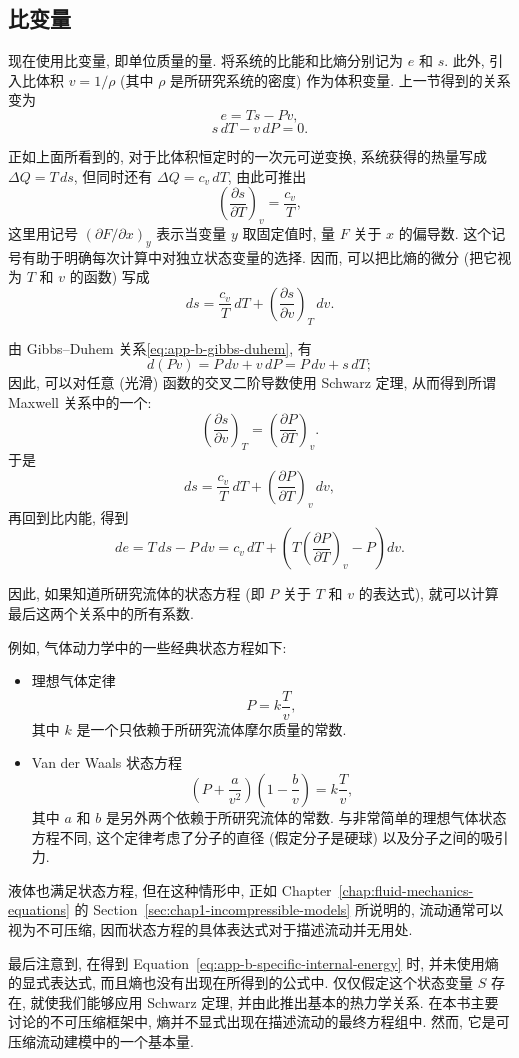 \subsection{比变量}
\label{sec:app-b-specific-variables}

现在使用比变量, 即单位质量的量. 将系统的比能和比熵分别记为 $e$ 和 $s$. 此外, 引入比体积 $v=1/\rho$ (其中 $\rho$ 是所研究系统的密度) 作为体积变量. 上一节得到的关系变为
\[
 e=Ts-Pv,
\]
\[
 s\,dT-v\,dP=0.
\]

正如上面所看到的, 对于比体积恒定时的一次元可逆变换, 系统获得的热量写成 $\Delta Q=T\,ds$, 但同时还有 $\Delta Q=c_v\,dT$, 由此可推出
\[
 \left(\frac{\partial s}{\partial T}\right)_v=\frac{c_v}{T},
\]
这里用记号 $(\partial F/\partial x)_y$ 表示当变量 $y$ 取固定值时, 量 $F$ 关于 $x$ 的偏导数. 这个记号有助于明确每次计算中对独立状态变量的选择. 因而, 可以把比熵的微分 (把它视为 $T$ 和 $v$ 的函数) 写成
\[
 ds=\frac{c_v}{T}\,dT+\left(\frac{\partial s}{\partial v}\right)_T\,dv.
\]

由 Gibbs--Duhem 关系\eqref{eq:app-b-gibbs-duhem}, 有
\[
 d(Pv)=P\,dv+v\,dP=P\,dv+s\,dT;
\]
因此, 可以对任意 (光滑) 函数的交叉二阶导数使用 Schwarz 定理, 从而得到所谓 Maxwell 关系中的一个:
\[
 \left(\frac{\partial s}{\partial v}\right)_T
 =\left(\frac{\partial P}{\partial T}\right)_v.
\]
于是
\[
 ds=\frac{c_v}{T}\,dT+\left(\frac{\partial P}{\partial T}\right)_v\,dv,
\]
再回到比内能, 得到
\begin{equation}
 de=T\,ds-P\,dv
 =c_v\,dT+\left(T\left(\frac{\partial P}{\partial T}\right)_v-P\right)dv.
 \label{eq:app-b-specific-internal-energy}
\end{equation}

因此, 如果知道所研究流体的状态方程 (即 $P$ 关于 $T$ 和 $v$ 的表达式), 就可以计算最后这两个关系中的所有系数.

例如, 气体动力学中的一些经典状态方程如下:
\begin{itemize}
 \item 理想气体定律
 \[
  P=k\frac{T}{v},
 \]
 其中 $k$ 是一个只依赖于所研究流体摩尔质量的常数.
 \item Van der Waals 状态方程
 \[
  \left(P+\frac{a}{v^2}\right)\left(1-\frac{b}{v}\right)=k\frac{T}{v},
 \]
 其中 $a$ 和 $b$ 是另外两个依赖于所研究流体的常数. 与非常简单的理想气体状态方程不同, 这个定律考虑了分子的直径 (假定分子是硬球) 以及分子之间的吸引力.
\end{itemize}

液体也满足状态方程, 但在这种情形中, 正如 Chapter~\ref{chap:fluid-mechanics-equations} 的 Section~\ref{sec:chap1-incompressible-models} 所说明的, 流动通常可以视为不可压缩, 因而状态方程的具体表达式对于描述流动并无用处.

最后注意到, 在得到 Equation~\eqref{eq:app-b-specific-internal-energy} 时, 并未使用熵的显式表达式, 而且熵也没有出现在所得到的公式中. 仅仅假定这个状态变量 $S$ 存在, 就使我们能够应用 Schwarz 定理, 并由此推出基本的热力学关系. 在本书主要讨论的不可压缩框架中, 熵并不显式出现在描述流动的最终方程组中. 然而, 它是可压缩流动建模中的一个基本量.
